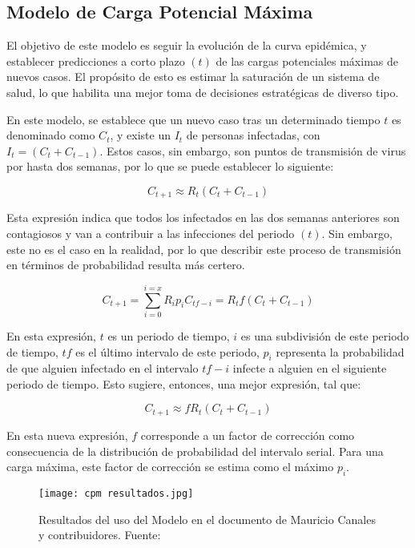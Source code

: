 \subsection{Modelo de Carga Potencial Máxima}
El objetivo de este modelo es seguir la evolución de la curva epidémica, y establecer predicciones a corto plazo $(t)$ de las cargas potenciales máximas de nuevos casos. El propósito de esto es estimar la saturación de un sistema de salud, lo que habilita una mejor toma de decisiones estratégicas de diverso tipo.

En este modelo, se establece que un nuevo caso tras un determinado tiempo $t$ es denominado como $C_t$, y existe un $I_t$ de personas infectadas, con $I_t = (C_t + C_{t-1})$. Estos casos, sin embargo, son puntos de transmisión de virus por hasta dos semanas, por lo que se puede establecer lo siguiente:

\begin{equation*}
    C_{t+1} \approx R_t (C_t + C_{t-1})
\end{equation*}

Esta expresión indica que todos los infectados en las dos semanas anteriores son contagiosos y van a contribuir a las infecciones del periodo $(t)$. Sin embargo, este no es el caso en la realidad, por lo que describir este proceso de transmisión en términos de probabilidad resulta más certero.

\begin{equation*}
    C_{t+1} =  \sum_{i=0}^{i=x} R_i p_i C_{tf - i} = R_t f(C_t + C_{t-1})
\end{equation*}

En esta expresión, $t$ es un periodo de tiempo, $i$ es una subdivisión de este periodo de tiempo, $tf$ es el último intervalo de este periodo, $p_i$ representa la probabilidad de que alguien infectado en el intervalo $tf-i$ infecte a alguien en el siguiente periodo de tiempo. Esto sugiere, entonces, una mejor expresión, tal que:

\begin{equation}
    C_{t+1} \approx fR_t (C_t + C_{t-1})
    \label{cpm_uno}
\end{equation}

En esta nueva expresión, $f$ corresponde a un factor de corrección como consecuencia de la distribución de probabilidad del intervalo serial. Para una carga máxima, este factor de corrección se estima como el máximo $p_i$.

\begin{figure}
    \texttt{[image: cpm resultados.jpg]}
    \caption{Resultados del uso del Modelo en el documento de Mauricio Canales y contribuidores. Fuente: \cite{canals_cuadrado_canals_2021}}
    \label{cpm resultados}
\end{figure}

